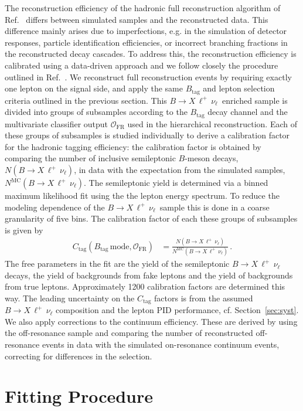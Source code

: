 \documentclass[twocolumn,aps,prd,superscriptaddress,nofootinbib,floatfix,preprintnumbers,a4]{revtex4-1}
\newcommand{\bxlnu}{\ensuremath{B \to X \, \ell^+\, \nu_{\ell}}\xspace}
\begin{document}
The reconstruction efficiency of the hadronic full reconstruction algorithm of Ref.~\cite{Feindt:2011mr} differs between simulated samples and the reconstructed data. This difference mainly arises due to imperfections, e.g. in the simulation of detector responses, particle identification efficiencies, or incorrect branching fractions in the reconstructed decay cascades. To address this, the reconstruction efficiency is calibrated using a data-driven approach and we follow closely the procedure outlined in Ref.~\cite{Glattauer:2015teq}. We reconstruct full reconstruction events by requiring exactly one lepton on the signal side, and apply the same $B_{\mathrm{tag}}$ and lepton selection criteria outlined in the previous section. This \bxlnu\ enriched sample is divided into groups of subsamples according to the $B_{\mathrm{tag}}$ decay channel and the multivariate classifier output $\mathcal{O}_{\mathrm{FR}}$ used in the hierarchical reconstruction. Each of these groups of subsamples is studied individually to derive a calibration factor for the hadronic tagging efficiency: the calibration factor is obtained by comparing the number of inclusive semileptonic $B$-meson decays, $N(\bxlnu)$, in data with the expectation from the simulated samples, $N^{\mathrm{MC}}(\bxlnu)$. The semileptonic yield is determined via a binned maximum likelihood fit using the the lepton energy spectrum. To reduce the modeling dependence of the \bxlnu\ sample this is done in a coarse granularity of five bins. The calibration factor of each these groups of subsamples is given by 
\begin{align}
 C_{\mathrm{tag}}(B_{\mathrm{tag}} \, \text{mode}, \mathcal{O}_{\mathrm{FR}}) & = \frac{ N(\bxlnu) }{ N^{\mathrm{MC}}(\bxlnu)} \, .
\end{align}
The free parameters in the fit are the yield of the semileptonic \bxlnu decays, the yield of backgrounds from fake leptons and the yield of backgrounds from true leptons. Approximately 1200 calibration factors are determined this way. The leading uncertainty on the $C_{\mathrm{tag}}$ factors is from the assumed \bxlnu composition and the lepton PID performance, cf. Section~\ref{sec:syst}. We also apply corrections to the continuum efficiency. These are derived by using the off-resonance sample and comparing the number of reconstructed off-resonance events in data with the simulated on-resonance continuum events, correcting for differences in the selection. 

\section{Fitting Procedure}\label{sec:fit}
\end{document}
